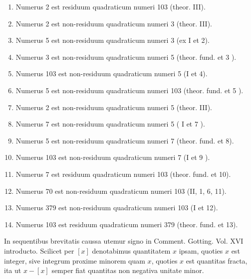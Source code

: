 \documentclass[10pt]{article}
\begin{document}
\begin{enumerate}
  \item Numerus 2 est residuum quadraticum numeri 103 (theor. III).

  \item Numerus 2 est non-residuum quadraticum numeri 3 (theor. III).

  \item Numerus 5 est non-residuum quadraticum numeri 3 (ex I et 2).

  \item Numerus 3 est non-residuum quadraticum numeri 5 (theor. fund. et 3 ).

  \item Numerus 103 est non-residuum quadraticum numeri 5 (I et 4).

  \item Numerus 5 est non-residuum quadraticum numeri 103 (theor. fund. et 5 ).

  \item Numerus 2 est non-residuum quadraticum numeri 5 (theor. III).

  \item Numerus 7 est non-residuum quadraticum numeri 5 ( \(\mathrm{I}\) et 7 ).

  \item Numerus 5 est non-residuum quadraticum numeri 7 (theor. fund. et 8).

  \item Numerus 103 est non-residuum quadraticum numeri 7 (I et 9 ).

  \item Numerus 7 est residuum quadraticum numeri 103 (theor. fund. et 10).

  \item Numerus 70 est non-residuum quadraticum numeri 103 (II, 1, 6, 11).

  \item Numerus 379 est non-residuum quadraticum numeri 103 (I et 12).

  \item Numerus 103 est residuum quadraticum numeri 379 (theor. fund. et 13).

\end{enumerate}

In sequentibus brevitatis caussa utemur signo in Comment. Gotting. Vol. XVI introducto. Scilicet per \([x]\) denotabimus quantitatem \(x\) ipsam, quoties \(x\) est integer, sive integrum proxime minorem quam \(x\), quoties \(x\) est quantitas fracta, ita ut \(x-[x]\) semper fiat quantitas non negativa unitate minor.
\end{document}
